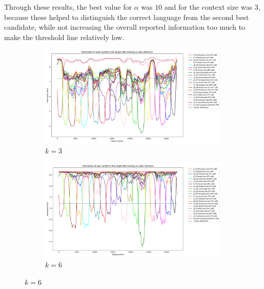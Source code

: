 \documentclass{article}
\begin{document}
Through these results, the best value for $\alpha$ was $10$ and for the context size was $3$, because these helped to distinguish the correct language from the second best candidate, while not increasing the overall reported information too much to make the threshold line relatively low.

\begin{figure}
    \begin{subfigure}[b]{0.3\textwidth}
        \begin{center}
            \includegraphics[width=1.0\linewidth]{../results/all_languages/-p_c:1:3.png}
        \end{center}
        \caption{$k = 3$}
        \label{fig:all_languages_p_c:1:3}
    \end{subfigure}
    \hfill
    \begin{subfigure}[b]{0.3\textwidth}
        \begin{center}
            \includegraphics[width=1.0\linewidth]{../results/all_languages/-p_c:1:6.png}
        \end{center}
        \caption{$k = 6$}
        \label{fig:all_languages_p_c:1:6}
    \end{subfigure}

\end{figure}
\end{document}
